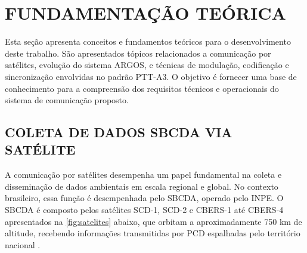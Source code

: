\chapter{FUNDAMENTAÇÃO TEÓRICA}\label{cap:revisao}

Esta seção apresenta conceitos e fundamentos teóricos para o desenvolvimento deste trabalho. São apresentados tópicos relacionados a comunicação por satélites, evolução do sistema ARGOS, e técnicas de modulação, codificação e sincronização envolvidas no padrão \gls{PTT-A3}. O objetivo é fornecer uma base de conhecimento para a compreensão dos requisitos técnicos e operacionais do sistema de comunicação proposto.

\section{COLETA DE DADOS SBCDA VIA SATÉLITE }\label{sec:sbcda}

A comunicação por satélites desempenha um papel fundamental na coleta e disseminação de dados ambientais em escala regional e global. No contexto brasileiro, essa função é desempenhada pelo \gls{SBCDA}, operado pelo \gls{INPE}. O \gls{SBCDA} é composto pelos satélites \gls{SCD-1}, \gls{SCD-2} e \gls{CBERS-1} até \gls{CBERS-4} apresentados na \autoref{fig:satelites} abaixo, que orbitam a aproximadamente 750 km de altitude, recebendo informações transmitidas por \gls{PCD} espalhadas pelo território nacional \cite{lima_parallel_2021}.



